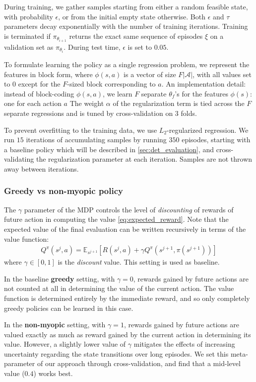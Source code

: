 During training, we gather samples starting from either a random feasible state, with probability $\epsilon$, or from the initial empty state otherwise.
Both $\epsilon$ and $\tau$ parameters decay exponentially with the number of training iterations.
Training is terminated if $\pi_{\theta_{i+1}}$ returns the exact same sequence of episodes $\xi$ on a validation set as $\pi_{\theta_{i}}$.
During test time, $\epsilon$ is set to $0.05$.

To formulate learning the policy as a single regression problem, we represent the features in block form, where $\phi(s,a)$ is a vector of size $F|\mathcal{A}|$, with all values set to $0$ except for the $F$-sized block corresponding to $a$.
An implementation detail: instead of block-coding $\phi(s,a)$, we learn $F$ separate $\theta_f$'s for the features $\phi(s)$: one for each action $a$
The weight $\alpha$ of the regularization term is tied across the $F$ separate regressions and is tuned by cross-validation on 3 folds.

To prevent overfitting to the training data, we use $L_2$-regularized regression.
We run $15$ iterations of accumulating samples by running $350$ episodes, starting with a baseline policy which will be described in \autoref{sec:det_evaluation}, and cross-validating the regularization parameter at each iteration.
Samples are not thrown away between iterations.

\subsubsection{Greedy vs non-myopic policy}

The $\gamma$ parameter of the MDP controls the level of \emph{discounting} of rewards of future action in computing the value \eqref{eq:expected_reward}.
Note that the expected value of the final evaluation can be written recursively in terms of the value function:
\begin{align} \label{eq:recursive_value}
Q^\pi(s^j,a) = \mathbb{E}_{s^{j+1}} [R(s^j,a) + \gamma Q^\pi(s^{j+1},\pi(s^{j+1}))]
\end{align}
where $\gamma \in [0,1]$ is the \emph{discount} value.
This setting is used as baseline.

In the baseline \textbf{greedy} setting, with $\gamma=0$, rewards gained by future actions are not counted at all in determining the value of the current action.
The value function is determined entirely by the immediate reward, and so only completely greedy policies can be learned in this case.

In the \textbf{non-myopic} setting, with $\gamma=1$, rewards gained by future actions are valued exactly as much as reward gained by the current action in determining its value.
However, a slightly lower value of $\gamma$ mitigates the effects of increasing uncertainty regarding the state transitions over long episodes.
We set this meta-parameter of our approach through cross-validation, and find that a mid-level value ($0.4$) works best.
